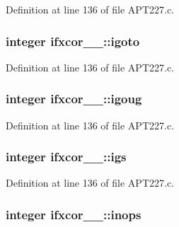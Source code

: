 Definition at line 136 of file A\+P\+T227.\+c.

\subsubsection[{\texorpdfstring{igoto}{igoto}}]{\setlength{\rightskip}{0pt plus 5cm}integer ifxcor\+\_\+\_\+\+::igoto}\hypertarget{structifxcor__1___a986a7bee681c8a4ac25665c6210c861d}{}\label{structifxcor__1___a986a7bee681c8a4ac25665c6210c861d}


Definition at line 136 of file A\+P\+T227.\+c.

\subsubsection[{\texorpdfstring{igoug}{igoug}}]{\setlength{\rightskip}{0pt plus 5cm}integer ifxcor\+\_\+\_\+\+::igoug}\hypertarget{structifxcor__1___a3ff302df89aa521652d067ea158f3771}{}\label{structifxcor__1___a3ff302df89aa521652d067ea158f3771}


Definition at line 136 of file A\+P\+T227.\+c.

\subsubsection[{\texorpdfstring{igs}{igs}}]{\setlength{\rightskip}{0pt plus 5cm}integer ifxcor\+\_\+\_\+\+::igs}\hypertarget{structifxcor__1___a7b973c1daed8836a87a9fd5a8feb0332}{}\label{structifxcor__1___a7b973c1daed8836a87a9fd5a8feb0332}


Definition at line 136 of file A\+P\+T227.\+c.

\subsubsection[{\texorpdfstring{inops}{inops}}]{\setlength{\rightskip}{0pt plus 5cm}integer ifxcor\+\_\+\_\+\+::inops}\hypertarget{structifxcor__1___a20efef9ee1b6f2addce40b98af97b692}{}\label{structifxcor__1___a20efef9ee1b6f2addce40b98af97b692}


